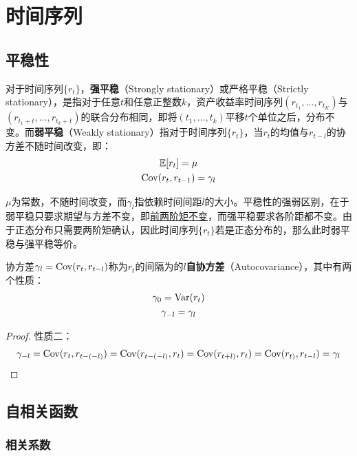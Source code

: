 \documentclass[11pt]{article}
\begin{document}
\section{时间序列}

\subsection{平稳性}

对于时间序列$\{r_t\}$，\textbf{强平稳}（Strongly stationary）或严格平稳（Strictly stationary），是指对于任意$t$和任意正整数$k$，资产收益率时间序列$(r_{t_1},\dots,r_{t_K})$与$(r_{t_1+t},\dots,r_{t_k+t})$的联合分布相同，即将$(t_1,\dots,t_k)$平移$t$个单位之后，分布不变。而\textbf{弱平稳}（Weakly stationary）指对于时间序列$\{r_t\}$，当$r_t$的均值与$r_{t-l}$的协方差不随时间改变，即：
\begin{gather*}
    \mathbb{E} [r_t] = \mu \\
    \operatorname{Cov} (r_t, r_{t-1}) = \gamma_l
\end{gather*}

$\mu$为常数，不随时间改变，而$\gamma_l$指依赖时间间距$l$的大小。平稳性的强弱区别，在于弱平稳只要求期望与方差不变，即\uline{前两阶矩不变}，而强平稳要求各阶距都不变。由于正态分布只需要两阶矩确认，因此时间序列$\{r_t\}$若是正态分布的，那么此时弱平稳与强平稳等价。

协方差$\gamma_l = \operatorname{Cov}(r_t,r_{t-l})$称为$r_t$的间隔为的$l$\textbf{自协方差}（Autocovariance），其中有两个性质：
\begin{gather*}
    \gamma_0 = \operatorname{Var}(r_t) \\
    \gamma_{-l} = \gamma_{l}
\end{gather*}

\begin{proof}
    性质二：
    \begin{equation*}
        \gamma_{-l} = \operatorname{Cov}(r_{t},r_{t-(-l)}) = \operatorname{Cov}(r_{t-(-l)},r_{t}) 
        = \operatorname{Cov}(r_{t+l)},r_{t}) = \operatorname{Cov}(r_{t)},r_{t-l}) = \gamma_{l}
    \end{equation*}
\end{proof}

\subsection{自相关函数}

\subsubsection{相关系数}
\end{document}
